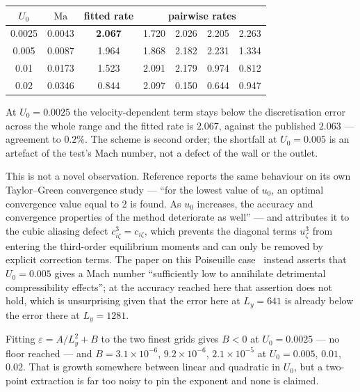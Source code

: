 \documentclass[11pt,a4paper]{article}
\newcommand{\e}[1]{\times 10^{#1}}
\begin{document}
\begin{center}\small
\begin{tabular}{ccccccc}
\toprule
$U_0$ & $\mathrm{Ma}$ & fitted rate & \multicolumn{4}{c}{pairwise rates} \\
\midrule
0.0025 & 0.0043 & \textbf{2.067} & 1.720 & 2.026 & 2.205 & 2.263 \\
0.005  & 0.0087 & 1.964 & 1.868 & 2.182 & 2.231 & 1.334 \\
0.01   & 0.0173 & 1.523 & 2.091 & 2.179 & 0.974 & 0.812 \\
0.02   & 0.0346 & 0.844 & 2.097 & 0.150 & 0.644 & 0.947 \\
\bottomrule
\end{tabular}
\end{center}

\noindent At $U_0 = 0.0025$ the velocity-dependent term stays below the
discretisation error across the whole range and the fitted rate is $2.067$,
against the published $2.063$ --- agreement to $0.2\%$. The scheme is second
order; the shortfall at $U_0=0.005$ is an artefact of the test's Mach number,
not a defect of the wall or the outlet.

This is not a novel observation. Reference \cite{derosis2020} reports the same
behaviour on its own Taylor--Green convergence study --- ``for the lowest value
of $u_0$, an optimal convergence value equal to 2 is found. As $u_0$ increases,
the accuracy and convergence properties of the method deteriorate as well'' ---
and attributes it to the cubic aliasing defect $c_{i\zeta}^3 = c_{i\zeta}$,
which prevents the diagonal terms $u_\zeta^3$ from entering the third-order
equilibrium moments and can only be removed by explicit correction terms. The
paper on this Poiseuille case~\cite{derosis2017pre} instead asserts that
$U_0=0.005$ gives a Mach number ``sufficiently low to annihilate detrimental
compressibility effects''; at the accuracy reached here that assertion does not
hold, which is unsurprising given that the error here at $L_y=641$ is already
below the error there at $L_y=1281$.

Fitting $\varepsilon = A/L_y^2 + B$ to the two finest grids gives $B<0$ at
$U_0=0.0025$ --- no floor reached --- and $B = 3.1\e{-6}$, $9.2\e{-6}$,
$2.1\e{-5}$ at $U_0 = 0.005$, $0.01$, $0.02$. That is growth somewhere between
linear and quadratic in $U_0$, but a two-point extraction is far too noisy to
pin the exponent and none is claimed.

\end{document}
